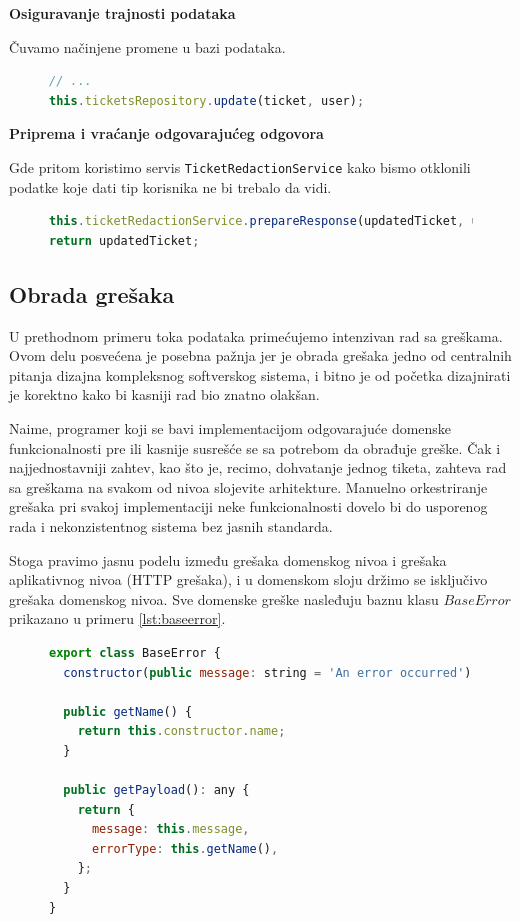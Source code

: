 \documentclass[12pt,oneside]{memoir}
\begin{document}
\textbf{Osiguravanje trajnosti podataka}

Čuvamo načinjene promene u bazi podataka.
\begin{figure}[h]
\begin{lstlisting}[language=JavaScript, style=ES6, caption={Korak očuvanja trajnosti podataka.}]
// ...
this.ticketsRepository.update(ticket, user);
\end{lstlisting}
\end{figure}

\newpage
\textbf{Priprema i vraćanje odgovarajućeg odgovora}

Gde pritom koristimo servis \verb|TicketRedactionService| kako bismo otklonili podatke koje dati tip korisnika ne bi trebalo da vidi.
\begin{figure}[h]
\begin{lstlisting}[language=JavaScript, style=ES6, caption={Korak pripreme i vraćanja odgovora.}]
this.ticketRedactionService.prepareResponse(updatedTicket, user);
return updatedTicket;
\end{lstlisting}
\end{figure}

\newpage
\subsection{Obrada grešaka}

U prethodnom primeru toka podataka primećujemo intenzivan rad sa greškama. Ovom delu posvećena je posebna pažnja jer je obrada grešaka jedno od centralnih pitanja dizajna kompleksnog softverskog sistema, i bitno je od početka dizajnirati je korektno kako bi kasniji rad bio znatno olakšan.

Naime, programer koji se bavi implementacijom odgovarajuće domenske funkcionalnosti pre ili kasnije susrešće se sa potrebom da obrađuje greške. Čak i najjednostavniji zahtev, kao što je, recimo, dohvatanje jednog tiketa, zahteva rad sa greškama na svakom od nivoa slojevite arhitekture. Manuelno orkestriranje grešaka pri svakoj implementaciji neke funkcionalnosti dovelo bi do usporenog rada i nekonzistentnog sistema bez jasnih standarda. 

Stoga pravimo jasnu podelu između grešaka domenskog nivoa i grešaka aplikativnog nivoa (HTTP grešaka), i u domenskom sloju držimo se isključivo grešaka domenskog nivoa. Sve domenske greške nasleđuju baznu klasu $BaseError$ prikazano u primeru \ref{lst:baseerror}.

\begin{figure}[h]
\begin{lstlisting}[language=JavaScript, style=ES6, caption={BaseError.ts}, label={lst:baseerror}]
export class BaseError {
  constructor(public message: string = 'An error occurred') {}

  public getName() {
    return this.constructor.name;
  }

  public getPayload(): any {
    return {
      message: this.message,
      errorType: this.getName(),
    };
  }
}
\end{lstlisting}
\end{figure}
\end{document}
